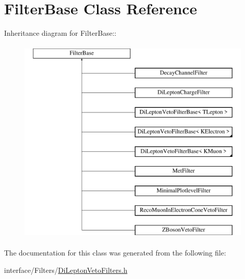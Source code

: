 \hypertarget{classFilterBase}{
\section{FilterBase Class Reference}
\label{classFilterBase}
}
Inheritance diagram for FilterBase::\begin{figure}[H]
\begin{center}
\leavevmode
\includegraphics[height=10cm]{classFilterBase}
\end{center}
\end{figure}


The documentation for this class was generated from the following file:\begin{DoxyCompactItemize}
\item 
interface/Filters/\hyperlink{DiLeptonVetoFilters_8h}{DiLeptonVetoFilters.h}\end{DoxyCompactItemize}
